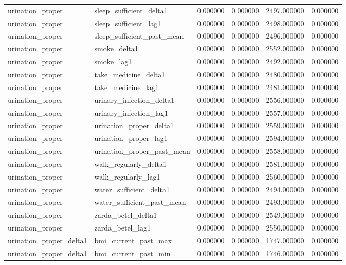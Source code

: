 \begin{longtable}{llrrrr}
urination\_proper & sleep\_sufficient\_delta1 & 0.000000 & 0.000000 & 2497.000000 & 0.000000 \\
urination\_proper & sleep\_sufficient\_lag1 & 0.000000 & 0.000000 & 2498.000000 & 0.000000 \\
urination\_proper & sleep\_sufficient\_past\_mean & 0.000000 & 0.000000 & 2496.000000 & 0.000000 \\
urination\_proper & smoke\_delta1 & 0.000000 & 0.000000 & 2552.000000 & 0.000000 \\
urination\_proper & smoke\_lag1 & 0.000000 & 0.000000 & 2492.000000 & 0.000000 \\
urination\_proper & take\_medicine\_delta1 & 0.000000 & 0.000000 & 2480.000000 & 0.000000 \\
urination\_proper & take\_medicine\_lag1 & 0.000000 & 0.000000 & 2481.000000 & 0.000000 \\
urination\_proper & urinary\_infection\_delta1 & 0.000000 & 0.000000 & 2556.000000 & 0.000000 \\
urination\_proper & urinary\_infection\_lag1 & 0.000000 & 0.000000 & 2557.000000 & 0.000000 \\
urination\_proper & urination\_proper\_delta1 & 0.000000 & 0.000000 & 2559.000000 & 0.000000 \\
urination\_proper & urination\_proper\_lag1 & 0.000000 & 0.000000 & 2594.000000 & 0.000000 \\
urination\_proper & urination\_proper\_past\_mean & 0.000000 & 0.000000 & 2558.000000 & 0.000000 \\
urination\_proper & walk\_regularly\_delta1 & 0.000000 & 0.000000 & 2581.000000 & 0.000000 \\
urination\_proper & walk\_regularly\_lag1 & 0.000000 & 0.000000 & 2560.000000 & 0.000000 \\
urination\_proper & water\_sufficient\_delta1 & 0.000000 & 0.000000 & 2494.000000 & 0.000000 \\
urination\_proper & water\_sufficient\_past\_mean & 0.000000 & 0.000000 & 2493.000000 & 0.000000 \\
urination\_proper & zarda\_betel\_delta1 & 0.000000 & 0.000000 & 2549.000000 & 0.000000 \\
urination\_proper & zarda\_betel\_lag1 & 0.000000 & 0.000000 & 2550.000000 & 0.000000 \\
urination\_proper\_delta1 & bmi\_current\_past\_max & 0.000000 & 0.000000 & 1747.000000 & 0.000000 \\
urination\_proper\_delta1 & bmi\_current\_past\_min & 0.000000 & 0.000000 & 1746.000000 & 0.000000 \\

\end{longtable}
